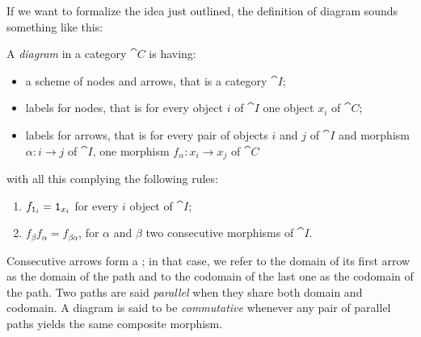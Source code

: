 If we want to formalize the idea just outlined, the definition of diagram sounds something like this:


\begin{definition}[Diagrams]
A {\em diagram} in a category \(\cat C\) is having:
\begin{itemize}
\item a scheme of nodes and arrows, that is a category \(\cat I\);
\item labels for nodes, that is for every object \(i\) of  \(\cat I\) one object \(x_i\) of \(\cat C\);
\item labels for arrows, that is for every pair of objects \(i\) and \(j\) of \(\cat I\) and morphism \(\alpha : i \to j\) of \(\cat I\), one morphism \(f_\alpha : x_i \to x_j\) of \(\cat C\)
\end{itemize}
with all this complying the following rules:
\begin{enumerate}
\item \(f_{\mathtt 1_i} = \mathtt 1_{x_i}\) for every \(i\) object of \(\cat I\);
\item \(f_\beta f_\alpha = f_{\beta\alpha}\), for \(\alpha\) and \(\beta\) two consecutive morphisms of \(\cat I\).
\end{enumerate}
\end{definition}

 Consecutive arrows form a ; in that case, we refer to the domain of its first arrow as the domain of the path and to the codomain of the last one as the codomain of the path. Two paths are said {\em parallel} when they share both domain and codomain. A diagram is said to be {\em commutative} whenever any pair of parallel paths yields the same composite morphism.


